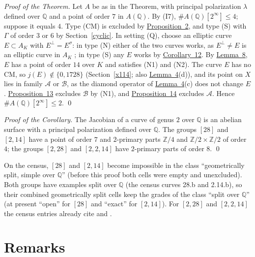 \documentclass[11pt]{article}
\newcommand{\Q}{\mathbb Q}
\newcommand{\Z}{\mathbb Z}
\begin{document}
\emph{Proof of the Theorem.} Let \(A\) be as in the Theorem, with principal polarization \(\lambda\) defined over
\(\Q\) and a point of order \(7\) in \(A(\Q)\). By (I7), \(\#A(\Q)[2^\infty]\le4\); suppose it equals \(4\). Type
(CM) is excluded by \hyperref[prop-cm]{Proposition~2}, and type (S) with \(\Gamma\) of order \(3\) or \(6\) by
Section~\ref{cyclic}. In setting (Q), choose an elliptic curve \(E\subset A_K\) with \(E^\perp=E^\sigma\): in type
(N) either of the two curves works, as \(E^\perp\neq E\) is an elliptic curve in \(A_K\) \cite[proof of
Lemma~3]{P45}; in type (S) any \(E\) works by \hyperref[cor-imag]{Corollary~12}. By \hyperref[lemma-glue]{Lemma~8}, \(E\) has a point
of order \(14\) over \(K\) and satisfies (N1) and (N2). The curve \(E\) has no CM, so \(j(E)\notin\{0,1728\}\)
(Section~\ref{x114}; also \hyperref[lemma-model]{Lemma~4}(d)), and its point on \(X\) lies in family \(\mathcal A\) or
\(\mathcal B\), as the diamond operator of \hyperref[lemma-model]{Lemma~4}(c) does not change \(E\).
\hyperref[prop-B]{Proposition~13} excludes \(\mathcal B\) by (N1), and \hyperref[prop-A]{Proposition~14} excludes \(\mathcal A\). Hence
\(\#A(\Q)[2^\infty]\le2\). \qed

\medskip
\emph{Proof of the Corollary.} The Jacobian of a curve of genus \(2\) over \(\Q\) is an abelian surface with a
principal polarization defined over \(\Q\). The groups \([28]\) and \([2,14]\) have a point of order \(7\) and
\(2\)-primary parts \(\Z/4\) and \(\Z/2\times\Z/2\) of order \(4\); the groups \([2,28]\) and \([2,2,14]\) have
\(2\)-primary parts of order \(8\). \qed

\medskip
On the census, \([28]\) and \([2,14]\) become impossible in the class ``geometrically split, simple over \(\Q\)''
(before this proof both cells were empty and unexcluded). Both groups have examples split over \(\Q\) (the census curves
28.b and 2.14.b), so their combined geometrically split cells keep the grades of the class ``split over \(\Q\)'' (at
present ``open'' for \([28]\) and ``exact'' for \([2,14]\)). For \([2,28]\) and \([2,2,14]\) the census entries
already cite \cite{P228} and \cite{P2214}.

\section{Remarks}\label{remarks}
\end{document}
